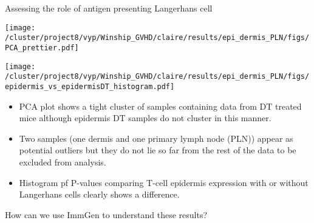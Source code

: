 \documentclass[final,hyperref={pdfpagelabels=false}]{beamer}
\begin{document}
\begin{frame}{}
\begin{columns}[t]
\begin{column}{.36\linewidth}
\begin{block}{Assessing the role of antigen presenting Langerhans cell}


\hfill

 \begin{minipage}{0.45\textwidth}
           \texttt{[image: /cluster/project8/vyp/Winship\_GVHD/claire/results/epi\_dermis\_PLN/figs/PCA\_prettier.pdf]}
          \end{minipage}
          \begin{minipage}{0.45\textwidth}
            \texttt{[image: /cluster/project8/vyp/Winship\_GVHD/claire/results/epi\_dermis\_PLN/figs/epidermis\_vs\_epidermisDT\_histogram.pdf]}
          \end{minipage}

{\small
          \begin{itemize}
          \item PCA plot shows a tight cluster of samples containing data from DT treated mice although epidermis DT samples do not cluster in this manner.
          \item Two samples (one dermis and one primary lymph node (PLN)) appear as potential outliers but they do not lie so far from the rest of the data to be excluded from analysis.
	  \item Histogram pf P-values comparing T-cell epidermis expression with or without Langerhans cells clearly shows a difference.
          \end{itemize}}
	\end{block}

        \begin{block}{How can we use ImmGen to understand these results?}
	  

\end{block}
\end{column}
\end{columns}
\end{frame}
\end{document}

